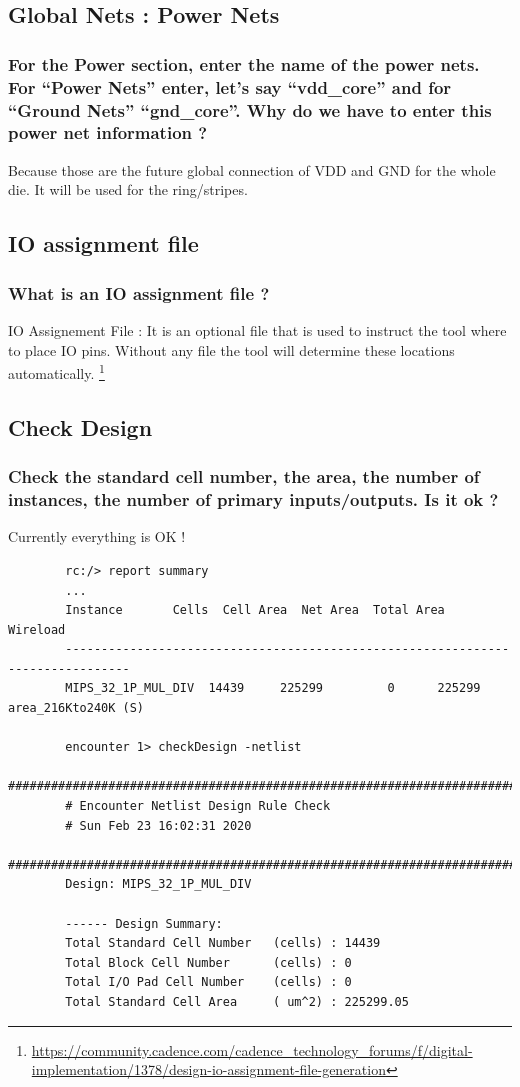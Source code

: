 \documentclass[11pt,a4paper,sans,dvipsnames]{report}
\begin{document}
	\subsection*{Global Nets : Power Nets}
	\subsubsection*{For the Power section, enter the name of the power nets. For “Power Nets” enter, let's say
		“vdd\_core” and for “Ground Nets” “gnd\_core”. Why do we have to enter this power net information ?}

	Because those are the future global connection of VDD and GND for the whole die. It will be used for the ring/stripes.

	\subsection*{IO assignment file}
	\subsubsection*{What is an IO assignment file ?}
	IO Assignement File : It is an optional file that is used to instruct the tool where to place IO pins. Without any file the tool will determine these locations automatically. \footnote{\url{https://community.cadence.com/cadence_technology_forums/f/digital-implementation/1378/design-io-assignment-file-generation}}

	\subsection*{Check Design}
	\subsubsection*{Check the standard cell number, the area, the number of instances, the number of primary
		inputs/outputs. Is it ok ?}

	Currently everything is OK !

	\begin{lstlisting}
		rc:/> report summary
		...
		Instance       Cells  Cell Area  Net Area  Total Area     Wireload        
		-------------------------------------------------------------------------------
		MIPS_32_1P_MUL_DIV  14439     225299         0      225299 area_216Kto240K (S) 

		encounter 1> checkDesign -netlist
		############################################################################
		# Encounter Netlist Design Rule Check
		# Sun Feb 23 16:02:31 2020
		############################################################################
		Design: MIPS_32_1P_MUL_DIV

		------ Design Summary:
		Total Standard Cell Number   (cells) : 14439
		Total Block Cell Number      (cells) : 0
		Total I/O Pad Cell Number    (cells) : 0
		Total Standard Cell Area     ( um^2) : 225299.05
	\end{lstlisting}
\end{document}
